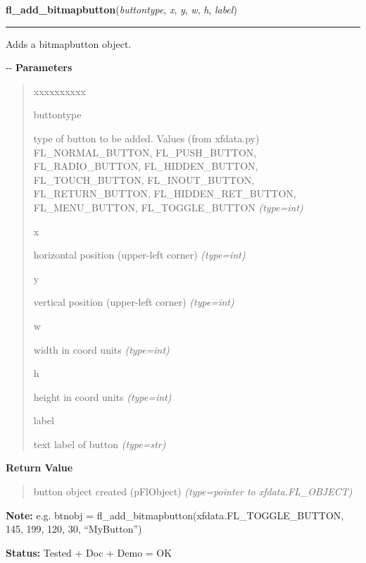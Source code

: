 \hspace{.8\funcindent}\begin{boxedminipage}{\funcwidth}

    \raggedright \textbf{fl\_add\_bitmapbutton}(\textit{buttontype}, \textit{x}, \textit{y}, \textit{w}, \textit{h}, \textit{label})

    \vspace{-1.5ex}

    \rule{\textwidth}{0.5\fboxrule}
\setlength{\parskip}{2ex}

Adds a bitmapbutton object.

-{}-
\setlength{\parskip}{1ex}
      \textbf{Parameters}
      \vspace{-1ex}

      \begin{quote}
        \begin{Ventry}{xxxxxxxxxx}

          \item[buttontype]


type of button to be added. Values (from xfdata.py) FL\_NORMAL\_BUTTON,
FL\_PUSH\_BUTTON, FL\_RADIO\_BUTTON, FL\_HIDDEN\_BUTTON, FL\_TOUCH\_BUTTON,
FL\_INOUT\_BUTTON, FL\_RETURN\_BUTTON, FL\_HIDDEN\_RET\_BUTTON,
FL\_MENU\_BUTTON, FL\_TOGGLE\_BUTTON
            {\it (type=int)}

          \item[x]


horizontal position (upper-left corner)
            {\it (type=int)}

          \item[y]


vertical position (upper-left corner)
            {\it (type=int)}

          \item[w]


width in coord units
            {\it (type=int)}

          \item[h]


height in coord units
            {\it (type=int)}

          \item[label]


text label of button
            {\it (type=str)}

        \end{Ventry}

      \end{quote}

      \textbf{Return Value}
    \vspace{-1ex}

      \begin{quote}

button object created (pFlObject)
      {\it (type=pointer to xfdata.FL\_OBJECT)}

      \end{quote}

\textbf{Note:} 
e.g. btnobj = fl\_add\_bitmapbutton(xfdata.FL\_TOGGLE\_BUTTON, 145,
199, 120, 30, ``MyButton'')


\textbf{Status:} 
Tested + Doc + Demo = OK


    \end{boxedminipage}

